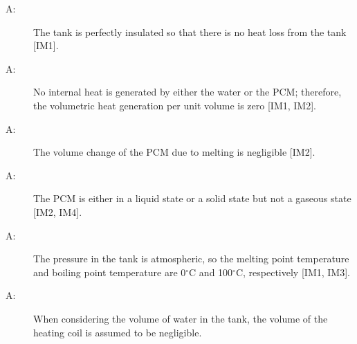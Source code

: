\documentclass[12pt]{article}
\newcounter{assumpnum}
\newcommand{\atheassumpnum}{A\theassumpnum}
\begin{document}
\begin{description}
\item[\atheassumpnum\label{A:assump15}:]The tank is perfectly insulated so that there is no heat loss from the tank {[}IM1{]}.
\end{description}
\begin{description}
\item[\atheassumpnum\label{A:assump16}:]No internal heat is generated by either the water or the PCM; therefore, the volumetric heat generation per unit volume is zero {[}IM1, IM2{]}.
\end{description}
\begin{description}
\item[\atheassumpnum\label{A:assump17}:]The volume change of the PCM due to melting is negligible {[}IM2{]}.
\end{description}
\begin{description}
\item[\atheassumpnum\label{A:assump18}:]The PCM is either in a liquid state or a solid state but not a gaseous state {[}IM2, IM4{]}.
\end{description}
\begin{description}
\item[\atheassumpnum\label{A:assump19}:]The pressure in the tank is atmospheric, so the melting point temperature and boiling point temperature are 0${}^{\circ}$C and 100${}^{\circ}$C, respectively {[}IM1, IM3{]}.
\end{description}
\begin{description}
\item[\atheassumpnum\label{A:assump20}:]When considering the volume of water in the tank, the volume of the heating coil is assumed to be negligible.
\end{description}
\end{document}
